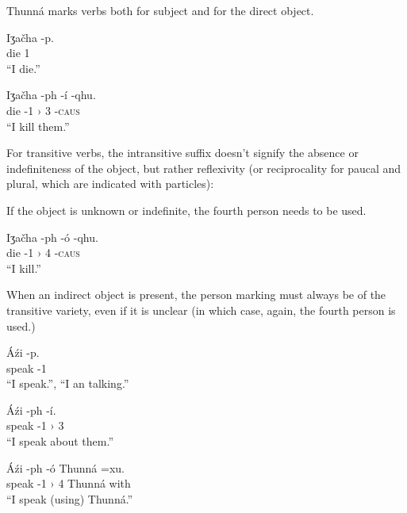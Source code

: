 \documentclass[11pt]{article} %
\begin{document}
Thunná marks verbs both for subject and for the direct object.

\begin{exe}
  \ex
  \gll Iʒačha  -p.\\
	   die     \textsc{1} \\
  \glt ``I die.''
  
  \ex
  \gll Iʒačha  -ph -í -qhu.\\
	   die     -\textsc{1 ›} \textsc{3} -\textsc{caus} \\
  \glt ``I kill them.''
\end{exe}

For transitive verbs, the intransitive suffix doesn't signify the absence or indefiniteness of the object, but rather reflexivity (or reciprocality for paucal and plural, which are indicated with particles):

\begin{exe}    
\end{exe}

If the object is unknown or indefinite, the fourth person needs to be used.
  
\begin{exe}  
  \ex
  \gll Iʒačha  -ph -ó -qhu.\\
	   die     -\textsc{1 ›} \textsc{4} -\textsc{caus} \\
  \glt ``I kill.''
\end{exe}

When an indirect object is present, the person marking must always be of the transitive variety, even if it is unclear (in which case, again, the fourth person is used.)
	
\begin{exe}  
  \ex
  \gll Áźi  -p.\\
	   speak     -\textsc{1}\\
  \glt ``I speak.'', ``I an talking.''
  
  \ex
  \gll Áźi  -ph -í.\\
	   speak     -\textsc{1 ›} \textsc{3} \\
  \glt ``I speak about them.''
  
	\ex
  \gll Áźi  -ph -ó Thunná =xu.\\
	   speak     -\textsc{1 ›} \textsc{4} Thunná with\\
  \glt ``I speak (using) Thunná.''
\end{exe}
\end{document}
